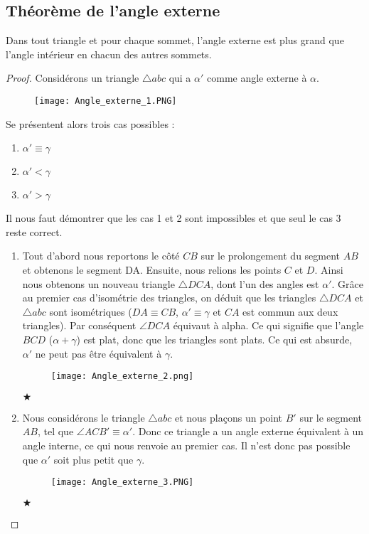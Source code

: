 \documentclass[a4paper,12pt]{article}
\begin{document}
\subsection{Théorème de l'angle externe}
\begin{theorem}
Dans tout triangle et pour chaque sommet, l'angle externe est plus grand que l'angle intérieur en chacun des autres sommets.
\end{theorem}

\begin{proof}
Considérons un triangle $\triangle abc$ qui a $\alpha'$ comme angle externe à $\alpha$.
\begin{figure}[H]
    \centering
    \texttt{[image: Angle\_externe\_1.PNG]}
\end{figure}

Se présentent alors trois cas possibles :

\begin{enumerate}
    \item $\alpha'  \equiv \gamma$
    \item $\alpha' < \gamma$
    \item $\alpha' > \gamma$
\end{enumerate}
Il nous faut démontrer que les cas 1 et 2 sont impossibles et que seul le cas 3 reste correct.
\begin{enumerate}

    \item Tout d'abord nous reportons le côté $CB$ sur le prolongement du segment $AB$ et obtenons le segment DA. Ensuite, nous relions les points $C$ et $D$. Ainsi nous obtenons un nouveau triangle $\triangle DCA$, dont l'un des angles est $\alpha'$.
	Grâce au premier cas d'isométrie des triangles, on déduit que les triangles $\triangle DCA$ et $\triangle abc$ sont isométriques ($DA \equiv CB$, $\alpha'\equiv \gamma$ et $CA$ est commun aux deux triangles). 
	Par conséquent $\angle{DCA}$ équivaut à alpha. Ce qui signifie que l'angle $BCD$ ($\alpha + \gamma$) est plat, donc que les triangles sont plats.
	Ce qui est absurde, $\alpha'$ ne peut pas être équivalent à $\gamma$. 
    \begin{figure}[H]
        \centering
        \texttt{[image: Angle\_externe\_2.png]}
    \end{figure}
	\begin{flushright}
    $\bigstar $
    \end{flushright}
    
    \item Nous considérons le triangle $\triangle abc$ et nous plaçons un point $B'$ sur le segment $AB$, tel que $\angle{ACB'} \equiv \alpha'$.
     Donc ce triangle a un angle externe équivalent à un angle interne, ce qui nous renvoie au premier cas. 
     Il n'est donc pas possible que $\alpha'$ soit plus petit que $\gamma$.
     \begin{figure}[H]
    \centering
    \texttt{[image: Angle\_externe\_3.PNG]}
\end{figure}
     \begin{flushright}
    $\bigstar $
    \end{flushright}


\end{enumerate}
\end{proof}
\end{document}
